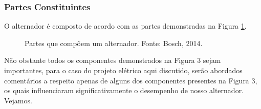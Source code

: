 \subsubsection{Partes Constituintes}
\label{construtivas-gerador-sincrono}

O alternador é composto de acordo com as partes demonstradas na Figura \ref{partes-alternador}.

\begin{figure}[h]
	\centering
	\caption{Partes que compõem um alternador. Fonte: Bosch, 2014. }
	\label{partes-alternador}
\end{figure}

Não obstante todos os componentes demonstrados na Figura 3 sejam importantes, para o caso do projeto elétrico aqui discutido, serão abordados comentários a respeito apenas de alguns dos componentes presentes na Figura 3, os quais influenciaram significativamente o desempenho de nosso alternador. Vejamos. 

